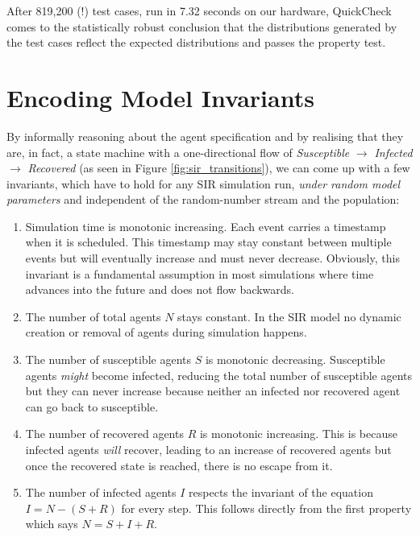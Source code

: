After 819,200 (!) test cases, run in 7.32 seconds on our hardware, QuickCheck comes to the statistically robust conclusion that the distributions generated by the test cases reflect the expected distributions and passes the property test.

\section{Encoding Model Invariants}
\label{sec:enc_model_inv}
By informally reasoning about the agent specification and by realising that they are, in fact, a state machine with a one-directional flow of \textit{Susceptible} $\rightarrow$ \textit{Infected} $\rightarrow$ \textit{Recovered} (as seen in Figure \ref{fig:sir_transitions}), we can come up with a few invariants, which have to hold for any SIR simulation run, \textit{under random model parameters} and independent of the random-number stream and the population:

\begin{enumerate}
	\item Simulation time is monotonic increasing. Each event carries a timestamp when it is scheduled. This timestamp may stay constant between multiple events but will eventually increase and must never decrease. Obviously, this invariant is a fundamental assumption in most simulations where time advances into the future and does not flow backwards.
	
	\item The number of total agents $N$ stays constant. In the SIR model no dynamic creation or removal of agents during simulation happens.
	
	\item The number of susceptible agents $S$ is monotonic decreasing. Susceptible agents \textit{might} become infected, reducing the total number of susceptible agents but they can never increase because neither an infected nor recovered agent can go back to susceptible.
	
	\item The number of recovered agents $R$ is monotonic increasing. This is because infected agents \textit{will} recover, leading to an increase of recovered agents but once the recovered state is reached, there is no escape from it.
	
	\item The number of infected agents $I$ respects the invariant of the equation $I = N - (S + R)$ for every step. This follows directly from the first property which says $N = S + I + R$.
\end{enumerate}

